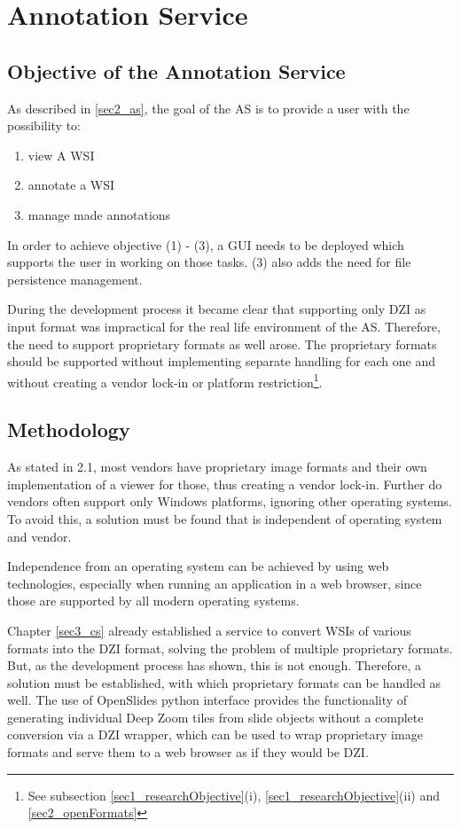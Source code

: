 \chapter{Annotation Service}

\section{Objective of the Annotation Service}
As described in \ref{sec2_as}, the goal of the AS is to provide a user with the possibility to:
\begin{enumerate}[(1)]
	\item view A WSI
	\item annotate a WSI
	\item manage made annotations
\end{enumerate}

In order to achieve objective (1) - (3), a GUI needs to be deployed which supports the user in working on those tasks. (3) also adds the need for file persistence management.

During the development process it became clear that supporting only DZI as input format was impractical for the real life environment of the AS. Therefore, the need to support proprietary formats as well arose. The proprietary formats should be supported without implementing separate handling for each one and without creating a vendor lock-in or platform restriction\footnote{See subsection \ref{sec1_researchObjective}(i), \ref{sec1_researchObjective}(ii) and \ref{sec2_openFormats}}.


\section{Methodology}
As stated in 2.1, most vendors have proprietary image formats and their own implementation of a viewer for those, thus creating a vendor lock-in. Further do vendors often support only Windows platforms, ignoring other operating systems\cite{Cornish13}\cite{DICOM10}\cite{Farahanil15}. To avoid this, a solution must be found that is independent of operating system and vendor.

Independence from an operating system can be achieved by using web technologies, especially when running an application in a web browser\cite{Tseytlin14}, since those are supported by all modern operating systems. 

Chapter \ref{sec3_cs} already established a service to convert WSIs of various formats into the DZI format, solving the problem of multiple proprietary formats. But, as the development process has shown, this is not enough. Therefore, a solution must be established, with which proprietary formats can be handled as well. The use of OpenSlides python interface provides the functionality of generating individual Deep Zoom tiles from slide objects without a complete conversion via a DZI wrapper, which can be used to wrap proprietary image formats and serve them to a web browser as if they would be DZI\cite{web:openslide}.

